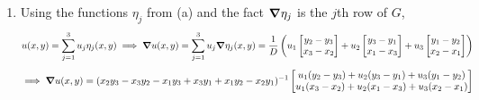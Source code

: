 \documentclass{article}
\newcommand{\br}[1]{\left(#1\right)}
\newcommand{\m}[2][b]{\begin{#1matrix}#2\end{#1matrix}}
\newcommand{\inv}{^{-1}}
\newcommand{\imp}{\implies}
\begin{document}
\begin{enumerate}[label=(\alph*)]
\item Using the functions $\eta_j$ from (a) and the fact $\grad\eta_j$ is the $j$th row of $G$,
$$u(x,y) = \sum_{j=1}^3 u_j\eta_j(x,y)
\imp \grad u(x,y) = \sum_{j=1}^3 u_j \grad\eta_j(x,y)
= \frac{1}{D}\br{u_1\m{y_2-y_3 \\ x_3-x_2} + u_2\m{y_3-y_1 \\ x_1-x_3} + u_3\m{y_1-y_2 \\ x_2-x_1}}$$
$$\imp \grad u(x,y) = (x_2y_3 - x_3y_2 - x_1y_3 + x_3y_1 + x_1y_2 - x_2y_1)\inv\m{u_1(y_2-y_3)+u_2(y_3-y_1)+u_3(y_1-y_2) \\ u_1(x_3-x_2)+u_2(x_1-x_3)+u_3(x_2-x_1)}$$

\end{enumerate}
	
\end{document}
